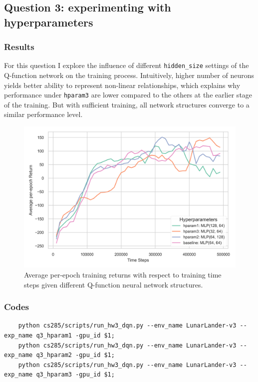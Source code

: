\documentclass[10pt, letterpaper]{article}
\begin{document}
\pagebreak
\subsection*{Question 3: experimenting with hyperparameters}
\subsubsection*{Results}

For this question I explore the influence of different \texttt{hidden\_size} settings of the Q-function network on the training process. Intuitively, higher number of neurons yields better ability to represent non-linear relationships, which explains why performance under \texttt{hparam3} are lower compared to the others at the earlier stage of the training. But with sufficient training, all network structures converge to a similar performance level.

\begin{figure}[thbp]
    \centering
    \includegraphics[width=\textwidth]{q3.png}
    \caption{Average per-epoch training returns with respect to training time steps given different Q-function neural network structures.}
    \label{fig:3}
\end{figure}
\subsubsection*{Codes}
\begin{lstlisting}
    python cs285/scripts/run_hw3_dqn.py --env_name LunarLander-v3 --exp_name q3_hparam1 -gpu_id $1;
    python cs285/scripts/run_hw3_dqn.py --env_name LunarLander-v3 --exp_name q3_hparam2 -gpu_id $1;
    python cs285/scripts/run_hw3_dqn.py --env_name LunarLander-v3 --exp_name q3_hparam3 -gpu_id $1;
\end{lstlisting}
\end{document}
